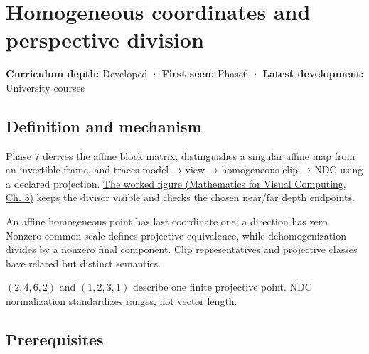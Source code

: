 \hypertarget{appendix-cb3b26862282}{}\label{referencestart:appendix-cb3b26862282}
\section{Homogeneous coordinates and perspective division}\label{appendix-cb3b26862282-homogeneous-coordinates-and-perspective-division}

\hypertarget{appendix-cb3b26862282-homogeneous-coordinates-and-perspective-division}{}

\textbf{Curriculum depth:} Developed · \textbf{First seen:} Phase6 · \textbf{Latest development:} University courses

\begin{allmightroledefinition}

\subsection{Definition and mechanism}\label{appendix-cb3b26862282-definition-and-mechanism}

\hypertarget{appendix-cb3b26862282-definition-and-mechanism}{}

Phase 7 derives the affine block matrix, distinguishes a singular affine map from an invertible frame, and traces model → view → homogeneous clip → NDC using a declared projection. \href{../02-Mathematics-for-Visual-Computing/main.pdf\#nameddest=01-foundations-i-ch019-figure-m6---follow-one-point-through-named-spaces}{The worked figure (Mathematics for Visual Computing, Ch. 3)} keeps the divisor visible and checks the chosen near/far depth endpoints.

\end{allmightroledefinition}

An affine homogeneous point has last coordinate one; a direction has zero. Nonzero common scale defines projective equivalence, while dehomogenization divides by a nonzero final component. Clip representatives and projective classes have related but distinct semantics.

\((2,4,6,2)\) and \((1,2,3,1)\) describe one finite projective point. NDC normalization standardizes ranges, not vector length.

\subsection{Prerequisites}\label{appendix-cb3b26862282-prerequisites}

\hypertarget{appendix-cb3b26862282-prerequisites}{}

